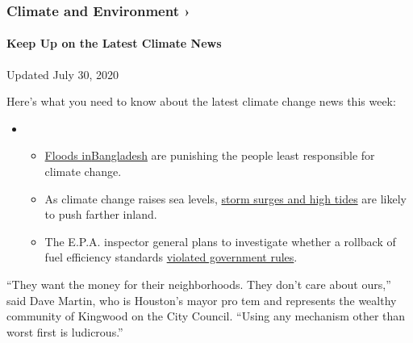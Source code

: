 \href{https://www.nytimes.com/section/climate?action=click\&pgtype=Article\&state=default\&region=MAIN_CONTENT_1\&context=storylines_keepup}{}

\hypertarget{climate-and-environment-}{%
\subsubsection{Climate and Environment
›}\label{climate-and-environment-}}

\hypertarget{keep-up-on-the-latest-climate-news}{%
\paragraph{Keep Up on the Latest Climate
News}\label{keep-up-on-the-latest-climate-news}}

Updated July 30, 2020

Here's what you need to know about the latest climate change news this
week:

\begin{itemize}
\item
  \begin{itemize}
  \tightlist
  \item
    \href{https://www.nytimes.com/2020/07/30/climate/bangladesh-floods.html?action=click\&pgtype=Article\&state=default\&region=MAIN_CONTENT_1\&context=storylines_keepup}{Floods
    in}\href{https://www.nytimes.com/2020/07/30/climate/bangladesh-floods.html?action=click\&pgtype=Article\&state=default\&region=MAIN_CONTENT_1\&context=storylines_keepup}{Bangladesh}
    are punishing the people least responsible for climate change.
  \item
    As climate change raises sea levels,
    \href{https://www.nytimes.com/2020/07/30/climate/sea-level-inland-floods.html?action=click\&pgtype=Article\&state=default\&region=MAIN_CONTENT_1\&context=storylines_keepup}{storm
    surges and high tides} are likely to push farther inland.
  \item
    The E.P.A. inspector general plans to investigate whether a rollback
    of fuel efficiency standards
    \href{https://www.nytimes.com/2020/07/27/climate/trump-fuel-efficiency-rule.html?action=click\&pgtype=Article\&state=default\&region=MAIN_CONTENT_1\&context=storylines_keepup}{violated
    government rules}.
  \end{itemize}
\end{itemize}

``They want the money for their neighborhoods. They don't care about
ours,'' said Dave Martin, who is Houston's mayor pro tem and represents
the wealthy community of Kingwood on the City Council. ``Using any
mechanism other than worst first is ludicrous.''

